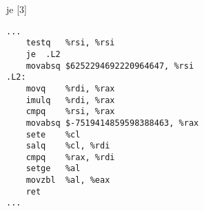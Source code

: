 \begin{figure}[H]
\begin{subfigure}[T]{0.30333333333333334\textwidth}
\begin{lrbox}{\mybox}
%
        \end{lrbox}\resizebox{\textwidth}{!}{\usebox{\mybox}}
\end{subfigure}
\begin{subfigure}[T]{0.30333333333333334\textwidth}
\caption*{}
\end{subfigure}
\begin{subfigure}[T]{0.30333333333333334\textwidth}
\caption*{}
\end{subfigure}
\hspace*{6mm}
\begin{subfigure}[T]{0.2733333333333333\textwidth}
\vspace*{2mm}\tiny je [3]
\begin{lstlisting}[style=defstyle,language={[x86masm]Assembler},basicstyle=\tiny\ttfamily,breaklines=true]
...
	testq	%rsi, %rsi
	je	.L2
	movabsq	$6252294692220964647, %rsi
.L2:
	movq	%rdi, %rax
	imulq	%rdi, %rax
	cmpq	%rsi, %rax
	movabsq	$-7519414859598388463, %rax
	sete	%cl
	salq	%cl, %rdi
	cmpq	%rax, %rdi
	setge	%al
	movzbl	%al, %eax
	ret
...\end{lstlisting}
\end{subfigure}
\end{figure}
\newpage\noindent